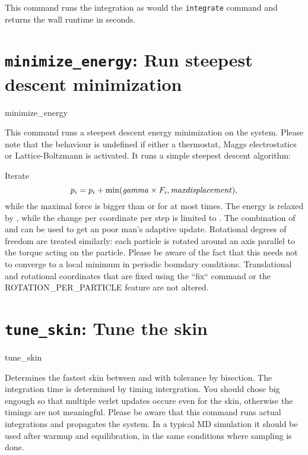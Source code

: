 This command runs the integration as would the \texttt{integrate} command and
returns the wall runtime in seconds.

\section{\texttt{minimize_energy}: Run steepest descent minimization}

\begin{essyntax}
   minimize_energy    
\end{essyntax}

This command runs a steepest descent energy minimization on the system.
Please note that the behaviour is undefined if either a thermostat, Maggs electrostatics or Lattice-Boltzmann is activated.
It runs a simple steepest descent algorithm:

Iterate
$$p_i = p_i + \min(\text{\var{gamma}} \times F_i, \text{\var{maxdisplacement}}),$$
while the maximal force is bigger than  or for at most  times.
The energy is relaxed by , while the change per coordinate per step is limited to .
The combination of  and  can be used to get an poor man's adaptive update.
Rotational degrees of freedom are treated similarly: each particle is rotated around an axis parallel to the torque acting on the particle.
Please be aware of the fact that this needs not to converge to a local minimum in periodic boundary conditions.
Translational and rotational coordinates that are fixed using the ``fix`` command or the ROTATION\_PER\_PARTICLE feature are not altered.

\section{\texttt{tune_skin}: Tune the skin}

\begin{essyntax}
   tune_skin    
\end{essyntax}

Determines the fastest skin between  and  with tolerance 
by bisection. The integration time is determined by timing  intergration.
You should chose  big engough so that multiple verlet updates occure even
for the  skin, otherwise the timings are not meaningful. Please be aware that
this command runs actual integrations and propagates the system. In a typical MD simulation
it should be used after warmup and equilibration, in the same conditions where sampling
is done.

